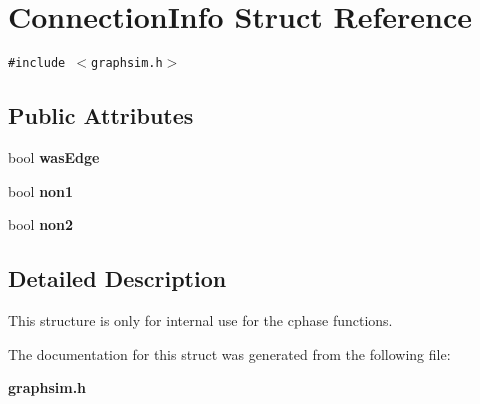 \section{Connection\-Info Struct Reference}
\label{structConnectionInfo}
{\tt \#include $<$graphsim.h$>$}

\subsection*{Public Attributes}
\begin{CompactItemize}
\item 
bool {\bf was\-Edge}\label{structConnectionInfo_o0}

\item 
bool {\bf non1}\label{structConnectionInfo_o1}

\item 
bool {\bf non2}\label{structConnectionInfo_o2}

\end{CompactItemize}


\subsection{Detailed Description}
This structure is only for internal use for the cphase functions. 



The documentation for this struct was generated from the following file:\begin{CompactItemize}
\item 
{\bf graphsim.h}\end{CompactItemize}
